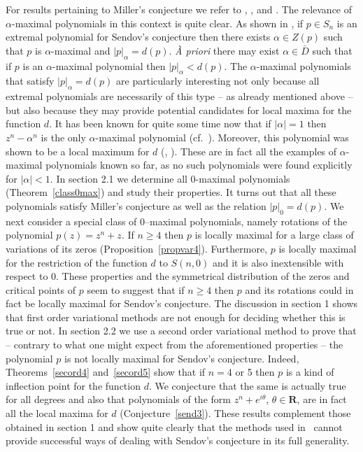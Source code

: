 \documentclass[10pt,twoside,a4paper,reqno]{amsart}
\theoremstyle{plain}
\theoremstyle{definition}
\begin{document}
{For results pertaining to Miller's conjecture we refer to \cite{B}, 
\cite{M1}, \cite{M2} and \cite{SSz}. 
The relevance of $\alpha$-maximal polynomials in this 
context is quite clear. As shown in \cite[Proposition 2.4]{M1}, if 
$p\in S_{n}$ is an extremal polynomial for Sendov's conjecture then there 
exists $\alpha\in Z(p)$ such that $p$ is $\alpha$-maximal and 
$|p|_{\alpha}=d(p)$. 
{\em \`A priori} there may exist $\alpha\in \bar{D}$ such that if $p$ is an 
$\alpha$-maximal polynomial then $|p|_{\alpha}<d(p)$. The $\alpha$-maximal 
polynomials that satisfy $|p|_{\alpha}=d(p)$ are 
particularly interesting not only because all extremal polynomials are 
necessarily of this type -- as already mentioned above -- but also because 
they may provide potential 
candidates for local maxima for the function $d$. 
It has been known for quite some time now that if 
$|\alpha|=1$ then $z^n-\alpha^n$ is the only $\alpha$-maximal polynomial 
(cf.~\cite{Ru}). Moreover, this 
polynomial was shown to be a local maximum for $d$ (\cite{M3}, 
\cite{VZ}). These are in fact all the examples of $\alpha$-maximal 
polynomials known so far, 
as no such polynomials were found explicitly for $|\alpha|<1$. In section 2.1 
we determine all 0-maximal polynomials 
(Theorem~\ref{class0max}) and study their properties. It turns out 
that all these polynomials satisfy Miller's conjecture as well as the relation
$|p|_{0}=d(p)$. We next consider a special class of 0--maximal polynomials, 
namely rotations of the polynomial $p(z)=z^n+z$. If $n\ge 4$ then 
$p$ is locally maximal for a large class of variations of its zeros 
(Proposition~\ref{propvar4}). Furthermore, $p$ is locally maximal for the 
restriction of the function $d$ to $S(n,0)$ and it is also inextensible with 
respect to 0. These properties and the symmetrical distribution of the 
zeros and critical points of $p$ seem to suggest that if $n\ge 4$ then $p$ 
and its rotations could in fact be locally maximal for Sendov's conjecture.
The discussion in section 1 shows that first order variational methods 
are not enough for deciding whether this is true or not. In section 2.2 we use 
a second order variational method to prove that -- contrary to what one might 
expect from the aforementioned properties -- the polynomial $p$ is not 
locally maximal for Sendov's conjecture. Indeed,  
Theorems~\ref{secord4} and~\ref{secord5} show that if $n=4$ or 5 then 
$p$ is a kind of inflection point for the function $d$. We conjecture that the 
same is actually true for all degrees and also that 
polynomials of the form $z^n+e^{i\theta}$, $\theta\in \mathbf{R}$, are in fact 
all the local maxima for $d$ (Conjecture~\ref{send3}). These
results complement those obtained in section 1 and show quite clearly that the 
methods used in~\cite{S1} cannot provide successful ways of dealing with 
Sendov's conjecture in its full generality. 

}
\end{document}
